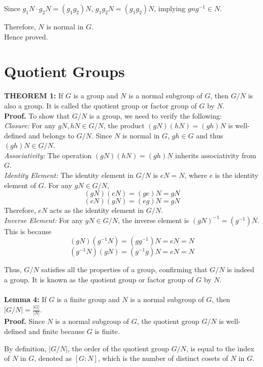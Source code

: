 Since \( g_1N \cdot g_2N = (g_1g_2)N \), \( g_1g_2N = (g_1g_2)N \), implying \( gng^{-1} \in N \).

Therefore, \( N \) is normal in \( G \).
\\Hence proved.
\section{Quotient Groups}
\textbf{THEOREM 1:} If \( G \) is a group and \( N \) is a normal subgroup of \( G \), then \( G/N \) is also a group. It is called the quotient group or factor group of \( G \) by \( N \).
\\
\textbf{Proof.} To show that \( G/N \) is a group, we need to verify the following:
\\\textit{Closure:} For any \( gN, hN \in G/N \), the product \( (gN)(hN) = (gh)N \) is well-defined and belongs to \( G/N \). Since \( N \) is normal in \( G \), \( gh \in G \) and thus \( (gh)N \in G/N \).
\\
\textit{Associativity:} The operation \( (gN)(hN) = (gh)N \) inherits associativity from \( G \).
\\
\textit{Identity Element:} The identity element in \( G/N \) is \( eN = N \), where \( e \) is the identity element of \( G \). For any \( gN \in G/N \),
   \[ (gN)(eN) = (ge)N = gN \]
   \[ (eN)(gN) = (eg)N = gN \]
   Therefore, \( eN \) acts as the identity element in \( G/N \).
\\
\textit{Inverse Element:} For any \( gN \in G/N \), the inverse element is \( (gN)^{-1} = (g^{-1})N \). This is because
   \[ (gN)(g^{-1}N) = (gg^{-1})N = eN = N \]
   \[ (g^{-1}N)(gN) = (g^{-1}g)N = eN = N \]

Thus, \( G/N \) satisfies all the properties of a group, confirming that \( G/N \) is indeed a group. It is known as the quotient group or factor group of \( G \) by \( N \).
\\\\
\textbf{Lemma 4:} If \( G \) is a finite group and \( N \) is a normal subgroup of \( G \), then \( |G/N| = \frac{|G|}{|N|} \).
\\
\textbf{Proof.} Since \( N \) is a normal subgroup of \( G \), the quotient group \( G/N \) is well-defined and finite because \( G \) is finite.

By definition, \( |G/N| \), the order of the quotient group \( G/N \), is equal to the index of \( N \) in \( G \), denoted as \( [G : N] \), which is the number of distinct cosets of \( N \) in \( G \).

